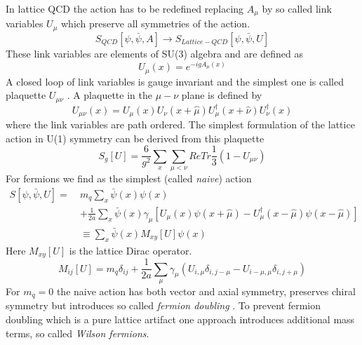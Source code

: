     \noindent
	In lattice QCD the action has to be redefined replacing $A_\mu$ by so called link variables $U_\mu$ which preserve all symmetries of the action.
	\begin{equation}
	    S_{QCD}[\psi,\bar{\psi},A] \rightarrow S_{Lattice-QCD}[\psi,\bar{\psi},U]
	\end{equation}
	These link variables are elements of SU(3) algebra and are defined as
	\begin{equation}
	    U_\mu(x) = e^{-igA_\mu(x)}
	\end{equation}
	A closed loop of link variables is gauge invariant and the simplest one is called plaquette $U_{\mu\nu}$ \cite{Rothe2012}. A plaquette in the $\mu - \nu$ plane is defined by
	\begin{equation}
	    U_{\mu\nu}(x) = U_\mu(x)U_\nu(x+\hat{\mu})U_\mu^\dagger(x+\hat{\nu})U_\nu^\dagger(x)
	\end{equation}
	where the link variables are path ordered. The simplest formulation of the lattice action in U(1) symmetry can be derived from this plaquette \cite{introduction_to_lattice_qcd}
	\begin{equation}
	    S_g[U] = \frac{6}{g^2}\sum_x\sum_{\mu<\nu}ReTr\frac{1}{3}(1-U_{\mu\nu})
	\end{equation}
	For fermions we find as the simplest (called \textit{naive}) action
	\begin{equation}\label{naive_lattice_action}
	    \begin{aligned}
	        S[\psi,\bar{\psi},U] =\ &m_q\sum_x\bar{\psi}(x)\psi(x)\\
	        &+ \frac{1}{2a}\sum_x\bar{\psi}(x)\gamma_\mu[U_\mu(x)\psi(x+\hat{\mu})-U_\mu^\dagger(x-\hat{\mu})\psi(x-\hat{\mu})]\\
	        &\equiv \sum_x\bar{\psi}(x)M_{xy}[U]\psi(x)
	    \end{aligned}
	\end{equation}
	Here $M_{xy}[U]$ is the lattice Dirac operator.
	\begin{equation}\label{naive_lattice_operator}
	    M_{ij}[U] = m_q\delta_{ij} + \frac{1}{2a}\sum_\mu\gamma_\mu(U_{i,\mu}\delta_{i,j-\mu} - U_{i-\mu,\mu}\delta_{i,j+\mu})
	\end{equation}
	For $m_q = 0$ the naive action  has both vector and axial symmetry, preserves chiral symmetry but introduces so called \textit{fermion doubling} \cite{introduction_to_lattice_qcd}. To prevent fermion doubling which is a pure lattice artifact one approach introduces additional mass terms, so called \textit{Wilson fermions}.
	
